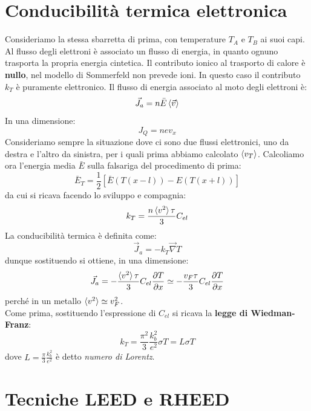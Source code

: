 \documentclass{book}
\begin{document}
    \section{Conducibilità termica elettronica}
        Consideriamo la stessa sbarretta di prima, con temperature $T_{A}$ e $T_{B}$ ai suoi capi. Al flusso degli elettroni è associato un flusso di energia, in quanto ognuno trasporta la propria energia cintetica. Il contributo ionico al trasporto di calore è \textbf{nullo}, nel modello di Sommerfeld non prevede ioni. In questo caso il contributo $k_{T}$ è puramente elettronico. Il flusso di energia associato al moto degli elettroni è:
        $$\vec{J}_{a} = n\bar{E} \braket{\vec{v}}$$
        In una dimensione:
        $$J_{Q} = nev_{x}$$
        Consideriamo sempre la situazione dove ci sono due flussi elettronici, uno da destra e l'altro da sinistra, per i quali prima abbiamo calcolato $\braket{v_{T}}$. Calcoliamo ora l'energia media $\bar{E}$ sulla falsariga del procedimento di prima:
        $$\bar{E}_{T} = \frac{1}{2} [\bar{E}(T(x-l))-E(T(x+l))]$$
        da cui si ricava facendo lo sviluppo e compagnia:
        $$k_{T} = \frac{n \braket{v^{2}} \tau}{3}C_{el}$$
        La conducibilità termica è definita come:
        $$\vec{J}_{a} = -k_{T} \vec{\nabla}T$$
        dunque sostituendo si ottiene, in una dimensione:
        $$\vec{J}_{a} = - \frac{\braket{v^{2}}\tau}{3}C_{el} \frac{\partial T}{\partial x} \simeq - \frac{v_{F} \tau}{3} C_{el} \frac{\partial T}{\partial x} $$
        perché in un metallo $\braket{v^{2}} \simeq v_{F} ^{2}$.\\
        Come prima, sostituendo l'espressione di $C_{el}$ si ricava la \textbf{legge di Wiedman-Franz}:
        $$k_{T} = \frac{\pi ^{2}}{3} \frac{k_{b} ^{2}}{e^{2}} \sigma T = L \sigma T$$
        dove $L = \displaystyle \frac{\pi}{3} \frac{k_{b} ^{2}}{e^{2}}$ è detto \textit{numero di Lorentz}.
    \section{Tecniche LEED e RHEED}
\end{document}
